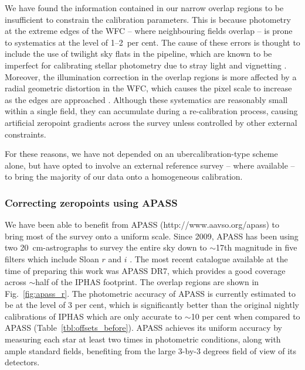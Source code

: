 \documentclass[a4paper,useAMS,usenatbib]{mn2e}
\begin{document}
We have found the information contained
in our narrow overlap regions to be insufficient
to constrain the calibration parameters.
This is because photometry at the extreme edges of the WFC
-- where neighbouring fields overlap -- 
is prone to systematics at the level of 1--2~per cent.
The cause of these errors is thought to include 
the use of twilight sky flats in the pipeline,
which are known to be imperfect for calibrating stellar photometry 
due to stray light and vignetting \citep[e.g.][]{Manfroid1995}.
Moreover, the illumination correction in the overlap regions
is more affected by a radial geometric distortion in the WFC,
which causes the pixel scale to increase as the edges 
are approached \citep{Gonzalez-Solares2011}.
Although these systematics are reasonably small within a single field,
they can accumulate during a re-calibration process,
causing artificial zeropoint gradients across the survey
unless controlled by other external constraints.

For these reasons, we have not depended
on an ubercalibration-type scheme alone,
but have opted to involve an external reference survey
-- where available --
to bring the majority of our data onto a homogeneous calibration.

\subsubsection{Correcting zeropoints using APASS}

We have been able to benefit from APASS
(http://www.aavso.org/apass)
to bring most of the survey 
onto a uniform scale.
Since 2009,
APASS has been using two 20~cm-astrographs
to survey the entire sky down to $\sim$17th magnitude
in five filters which include Sloan $r$ and $i$ \citep{Henden2012}.
The most recent catalogue available 
at the time of preparing this work was APASS DR7,
which provides a good coverage across $\sim$half
of the IPHAS footprint.
The overlap regions are shown in Fig.~\ref{fig:apass_r}.
The photometric accuracy of APASS is currently estimated 
to be at the level of 3 per cent,
which is significantly better 
than the original nightly calibrations of IPHAS
which are only accurate to $\sim$10 per cent
when compared to APASS (Table~\ref{tbl:offsets_before}).
APASS achieves its uniform accuracy 
by measuring each star at least two times in photometric conditions,
along with ample standard fields,
benefiting from the large 3-by-3 degrees field of view of its detectors.
\end{document}
